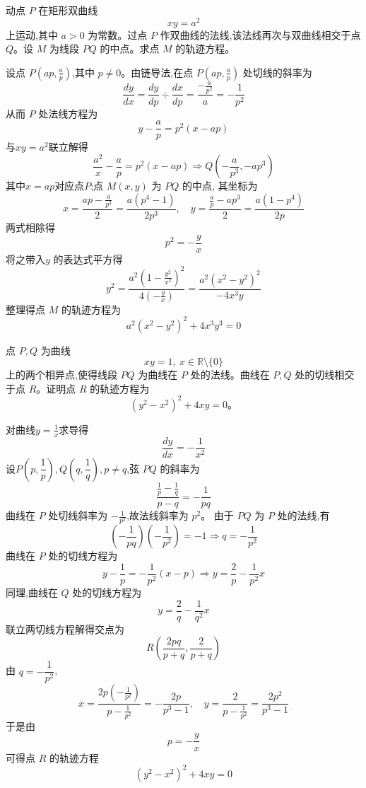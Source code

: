\begin{questions}
    \question 动点 $P$ 在矩形双曲线
    \[
    xy=a^{2}
    \]
    上运动,其中 $a>0$ 为常数。过点 $P$ 作双曲线的法线,该法线再次与双曲线相交于点 $Q$。设 $M$ 为线段 $PQ$ 的中点。求点 $M$ 的轨迹方程。
    \begin{solution}
        设点 $P\left(ap, \frac{a}{p}\right)$,其中 $p \neq 0$。由链导法,在点 $P(ap, \frac{a}{p})$ 处切线的斜率为
        \[
        \frac{dy}{dx}=\frac{dy}{dp} \div \frac{dx}{dp} = \frac{-\frac{a}{p^2}}{a}=-\frac{1}{p^{2}}
        \]
        从而 $P$ 处法线方程为
        \[
        y - \frac{a}{p} = p^{2}(x - ap)
        \]
        与$xy=a^{2}$联立解得
        \[
        \frac{a^{2}}{x} - \frac{a}{p} = p^{2}(x - ap) \Rightarrow Q\left(-\frac{a}{p^{3}}, -ap^{3}\right)
        \]
        其中$x = ap$对应点$P$;点 $M(x, y)$ 为 $PQ$ 的中点, 其坐标为
        \[
        x = \frac{ap - \frac{a}{p^{3}}}{2} = \frac{a(p^{4}-1)}{2p^{3}}, \quad y = \frac{\frac{a}{p} - ap^{3}}{2} = \frac{a(1-p^{4})}{2p}
        \]
        两式相除得
        \[
        p^{2} = -\frac{y}{x}
        \]
        将之带入$y$ 的表达式平方得
        \[
        y^{2} = \frac{a^{2}\left(1 - \frac{y^{2}}{x^{2}}\right)^{2}}{4\left(-\frac{y}{x}\right)} = \frac{a^{2}(x^{2}-y^{2})^{2}}{-4x^{3}y}
        \]
        整理得点 $M$ 的轨迹方程为
        \[
        a^{2}(x^{2}-y^{2})^{2} + 4x^{3}y^{3} = 0
        \]
    \end{solution}

    \question 点 $P,Q$ 为曲线
    \[
    xy=1,\ x\in\mathbb{R} \setminus \{0\}
    \]
    上的两个相异点,使得线段 $PQ$ 为曲线在 $P$ 处的法线。曲线在 $P,Q$ 处的切线相交于点 $R$。证明点 $R$ 的轨迹方程为
    \[
    (y^2-x^2)^2+4xy=0。
    \]
    \begin{solution}
        对曲线$y=\frac{1}{x}$求导得
        \[
        \frac{dy}{dx}=-\frac{1}{x^2}
        \]
        设$P\left(p,\dfrac{1}{p}\right), Q\left(q,\dfrac{1}{q}\right), p\neq q$,弦 $PQ$ 的斜率为
        \[
        \frac{\frac{1}{p}-\frac{1}{q}}{p-q}=-\frac{1}{pq}
        \]
        曲线在 $P$ 处切线斜率为 $-\frac{1}{p^2}$,故法线斜率为 $p^2$。
        由于 $PQ$ 为 $P$ 处的法线,有
        \[
        \left(-\frac{1}{pq}\right)\left(-\frac{1}{p^2}\right)=-1 \Rightarrow q=-\frac{1}{p^2}
        \]
        曲线在 $P$ 处的切线方程为
        \[
        y-\frac{1}{p}=-\frac{1}{p^2}(x-p) \Rightarrow y=\frac{2}{p}-\frac{1}{p^2}x
        \]
        同理,曲线在 $Q$ 处的切线方程为
        \[
        y=\frac{2}{q}-\frac{1}{q^2}x
        \]
        联立两切线方程解得交点为
        \[
        R\left(\frac{2pq}{p+q},\frac{2}{p+q}\right)
        \]
        由 $q=-\dfrac{1}{p^2}$,
        \[
        x = \frac{2p\left(-\frac{1}{p^2}\right)}{p-\frac{1}{p^2}}= -\frac{2p}{p^3-1},\quad
        y = \frac{2}{p-\frac{1}{p^2}}= \frac{2p^2}{p^3-1}
        \]
        于是由
        \[
        p=-\frac{y}{x}
        \]
        可得点 $R$ 的轨迹方程
        \[
        (y^2-x^2)^2+4xy=0
        \]
    \end{solution}


\end{questions}

